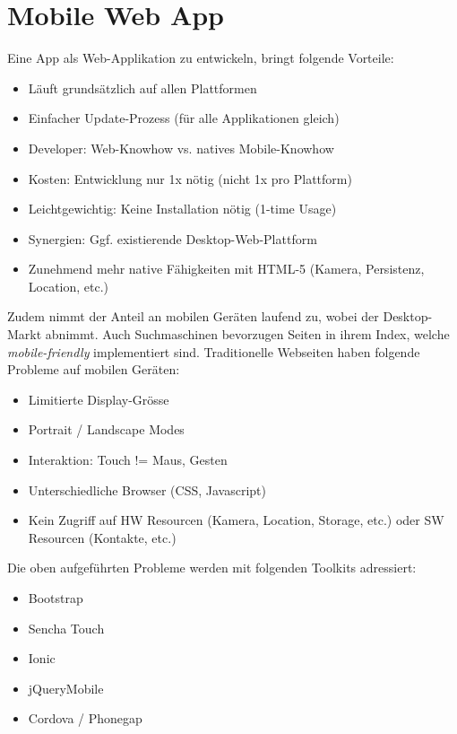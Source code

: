 \chapter{Mobile Web App}

Eine App als Web-Applikation zu entwickeln, bringt folgende Vorteile:

\begin{itemize}
	\item Läuft grundsätzlich auf allen Plattformen
	\item Einfacher Update-Prozess (für alle Applikationen gleich)
	\item Developer: Web-Knowhow vs. natives Mobile-Knowhow
	\item Kosten: Entwicklung nur 1x nötig (nicht 1x pro Plattform)
	\item Leichtgewichtig: Keine Installation nötig (1-time Usage)
	\item Synergien: Ggf. existierende Desktop-Web-Plattform
	\item Zunehmend mehr native Fähigkeiten mit HTML-5 (Kamera, Persistenz, Location, etc.)
\end{itemize}

Zudem nimmt der Anteil an mobilen Geräten laufend zu, wobei der Desktop-Markt abnimmt. Auch Suchmaschinen bevorzugen Seiten in ihrem Index, welche \textit{mobile-friendly} implementiert sind. Traditionelle Webseiten haben folgende Probleme auf mobilen Geräten:

\begin{itemize}
	\item Limitierte Display-Grösse
	\item Portrait / Landscape Modes
	\item Interaktion: Touch != Maus, Gesten
	\item Unterschiedliche Browser (CSS, Javascript)
	\item Kein Zugriff auf HW Resourcen (Kamera, Location, Storage, etc.) oder SW Resourcen (Kontakte, etc.)
\end{itemize}

Die oben aufgeführten Probleme werden mit folgenden Toolkits adressiert:

\begin{itemize}
	\item Bootstrap
	\item Sencha Touch
	\item Ionic
	\item jQueryMobile
	\item Cordova / Phonegap
\end{itemize}

